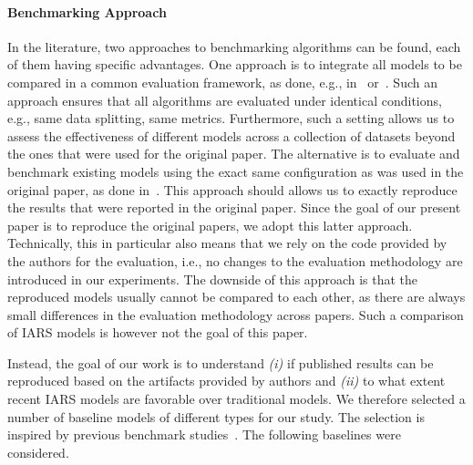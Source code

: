 \documentclass[sigconf,natbib=true,nonacm]{acmart}
\begin{document}
\paragraph{Benchmarking Approach}
In the literature, two approaches to benchmarking algorithms can be found, each of them having specific advantages. One approach is to integrate all models to be compared in a common evaluation framework, as done, e.g., in~\cite{anellitop2022} or~\cite{ludewiglatifiumuai2020}.
Such an approach ensures that all algorithms are evaluated under identical conditions, e.g., same data splitting, same metrics. Furthermore, such a setting allows us to assess the effectiveness of different models across a collection of datasets beyond the ones that were used for the original paper. The alternative is to evaluate and benchmark existing models using the exact same configuration as was used in the original paper, as done in~\cite{ferraridacremaetal2019}. This approach should allows us to exactly reproduce the results that were reported in the original paper. Since the goal of our present paper is to reproduce the original papers, we adopt this latter approach. Technically, this in particular also means that we rely on the code provided by the authors for the evaluation, i.e., no changes to the evaluation methodology are introduced in our experiments. The downside of this approach is that the reproduced models usually cannot be compared to each other, as there are always small differences in the evaluation methodology across papers. Such a comparison of IARS models is however not the goal of this paper.

Instead, the goal of our work is to understand \emph{(i)} if published results can be reproduced based on the artifacts provided by authors and \emph{(ii)} to what extent recent IARS models are favorable over traditional models. We therefore selected a number of baseline models of different types for our study. The selection is inspired by previous benchmark studies~\cite{ferraridacremaetal2019,anellitop2022}.
The following baselines were considered.
\end{document}
